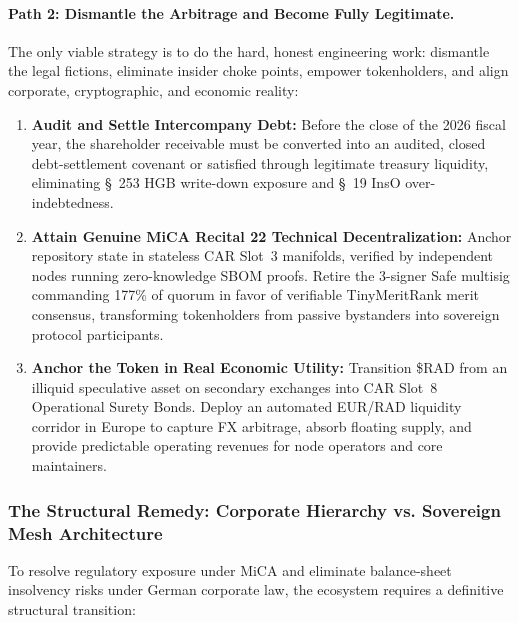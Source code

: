 \documentclass[a4paper,11pt,twoside,parskip=half-,headings=small]{scrartcl}
\begin{document}
\paragraph{Path 2: Dismantle the Arbitrage and Become Fully Legitimate.}
The only viable strategy is to do the hard, honest engineering work: dismantle the legal fictions, eliminate insider choke points, empower tokenholders, and align corporate, cryptographic, and economic reality:
\begin{enumerate}[nosep]
  \item \textbf{Audit and Settle Intercompany Debt:} Before the close of the 2026 fiscal year, the  shareholder receivable must be converted into an audited, closed debt-settlement covenant or satisfied through legitimate treasury liquidity, eliminating \S~253 HGB write-down exposure and \S~19 InsO over-indebtedness.
  \item \textbf{Attain Genuine MiCA Recital 22 Technical Decentralization:} Anchor repository state in stateless CAR Slot~3 manifolds, verified by independent nodes running zero-knowledge SBOM proofs. Retire the 3-signer Safe multisig commanding 177\% of quorum in favor of verifiable TinyMeritRank merit consensus, transforming tokenholders from passive bystanders into sovereign protocol participants.
  \item \textbf{Anchor the Token in Real Economic Utility:} Transition \$RAD from an illiquid speculative asset on secondary exchanges into CAR Slot~8 Operational Surety Bonds. Deploy an automated EUR/RAD liquidity corridor in Europe to capture FX arbitrage, absorb floating supply, and provide predictable operating revenues for node operators and core maintainers.
\end{enumerate}

\subsubsection{The Structural Remedy: Corporate Hierarchy vs. Sovereign Mesh Architecture}
\label{sec:structural_remedy}

To resolve regulatory exposure under MiCA and eliminate balance-sheet insolvency risks under German corporate law, the ecosystem requires a definitive structural transition:
\end{document}
